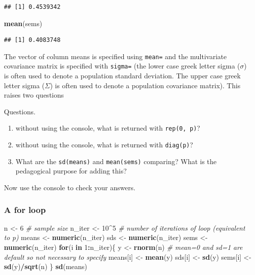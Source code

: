 \documentclass[]{book}
\newenvironment{Shaded}{\begin{snugshade}}{\end{snugshade}}
\newcommand{\KeywordTok}[1]{\textcolor[rgb]{0.13,0.29,0.53}{\textbf{#1}}}
\newcommand{\DecValTok}[1]{\textcolor[rgb]{0.00,0.00,0.81}{#1}}
\newcommand{\StringTok}[1]{\textcolor[rgb]{0.31,0.60,0.02}{#1}}
\newcommand{\CommentTok}[1]{\textcolor[rgb]{0.56,0.35,0.01}{\textit{#1}}}
\newcommand{\ControlFlowTok}[1]{\textcolor[rgb]{0.13,0.29,0.53}{\textbf{#1}}}
\newcommand{\OperatorTok}[1]{\textcolor[rgb]{0.81,0.36,0.00}{\textbf{#1}}}
\newcommand{\NormalTok}[1]{#1}
\providecommand{\tightlist}{%
  \setlength{\itemsep}{0pt}\setlength{\parskip}{0pt}}
\theoremstyle{definition}
\theoremstyle{definition}
\theoremstyle{definition}
\theoremstyle{remark}
\begin{document}
\begin{verbatim}
## [1] 0.4539342
\end{verbatim}

\begin{Shaded}
\begin{Highlighting}[]
\KeywordTok{mean}\NormalTok{(sems)}
\end{Highlighting}
\end{Shaded}

\begin{verbatim}
## [1] 0.4083748
\end{verbatim}

The vector of column means is specified using \texttt{mean=} and the
multivariate covariance matrix is specified with \texttt{sigma=} (the
lower case greek letter sigma (\(\sigma\)) is often used to denote a
population standard deviation. The upper case greek letter sigma
(\(\Sigma\)) is often used to denote a population covariance matrix).
This raises two questions

Questions.

\begin{enumerate}
\def\labelenumi{\arabic{enumi}.}
\tightlist
\item
  without using the console, what is returned with \texttt{rep(0,\ p)}?
\item
  without using the console, what is returned with \texttt{diag(p)}?
\item
  What are the \texttt{sd(means)} and \texttt{mean(sems)} comparing?
  What is the pedagogical purpose for adding this?
\end{enumerate}

Now use the console to check your answers.

\subsubsection{A for loop}\label{a-for-loop}

\begin{Shaded}
\begin{Highlighting}[]
\NormalTok{n <-}\StringTok{ }\DecValTok{6} \CommentTok{# sample size}
\NormalTok{n_iter <-}\StringTok{ }\DecValTok{10}\OperatorTok{^}\DecValTok{5} \CommentTok{# number of iterations of loop (equivalent to p)}
\NormalTok{means <-}\StringTok{ }\KeywordTok{numeric}\NormalTok{(n_iter)}
\NormalTok{sds <-}\StringTok{ }\KeywordTok{numeric}\NormalTok{(n_iter)}
\NormalTok{sems <-}\StringTok{ }\KeywordTok{numeric}\NormalTok{(n_iter)}
\ControlFlowTok{for}\NormalTok{(i }\ControlFlowTok{in} \DecValTok{1}\OperatorTok{:}\NormalTok{n_iter)\{}
\NormalTok{  y <-}\StringTok{ }\KeywordTok{rnorm}\NormalTok{(n) }\CommentTok{# mean=0 and sd=1 are default so not necessary to specify}
\NormalTok{  means[i] <-}\StringTok{ }\KeywordTok{mean}\NormalTok{(y)}
\NormalTok{  sds[i] <-}\StringTok{ }\KeywordTok{sd}\NormalTok{(y)}
\NormalTok{  sems[i] <-}\StringTok{ }\KeywordTok{sd}\NormalTok{(y)}\OperatorTok{/}\KeywordTok{sqrt}\NormalTok{(n)}
\NormalTok{\}}
\KeywordTok{sd}\NormalTok{(means)}
\end{Highlighting}
\end{Shaded}
\end{document}
